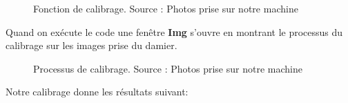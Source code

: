  \begin{figure}[H]%
 	\center%
 	\setlength{\fboxsep}{5pt}%
 	\setlength{\fboxrule}{0.5pt}%
 	\caption[Fonction de calibrage]{Fonction de calibrage. Source : Photos prise sur notre machine}
 	\label{fig:Fonction de calibrage}
 \end{figure}

Quand on exécute le code une fenêtre \textbf{Img} s'ouvre en montrant le processus du calibrage sur les images prise du damier. 

\begin{figure}[H]%
	\center%
	\setlength{\fboxsep}{5pt}%
	\setlength{\fboxrule}{0.5pt}%
	\caption[Processus de calibrage]{Processus de calibrage. Source : Photos prise sur notre machine}
	\label{fig:Processus de calibrage}
\end{figure}

\vspace{1 cm}
Notre calibrage donne les résultats suivant: 

